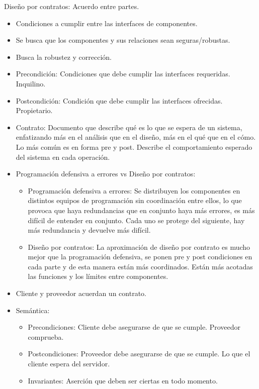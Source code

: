 \documentclass[12pt, twoside, openright]{report} %
\begin{document}
Diseño por contratos: Acuerdo entre partes.

\begin{itemize}
	\item Condiciones a cumplir entre las interfaces de componentes.
	\item Se busca que los componentes y sus relaciones sean
	      seguras/robustas.
	\item Busca la robustez y corrección.
	\item Precondición: Condiciones que debe cumplir las interfaces
	      requeridas. Inquilino.
	\item Postcondición: Condición que debe cumplir las interfaces
	      ofrecidas. Propietario.
	\item Contrato: Documento que describe qué es lo que se espera de un
	      sistema, enfatizando más en el análisis que en el diseño, más en
	      el qué que en el cómo. Lo más común es en forma pre y post.
	      Describe el comportamiento esperado del sistema en cada operación.
	\item Programación defensiva a errores vs Diseño por contratos:

	      \begin{itemize}
		      \item Programación defensiva a errores: Se distribuyen los componentes
		            en distintos equipos de programación sin coordinación entre
		            ellos, lo que provoca que haya redundancias que en conjunto haya
		            más errores, es más difícil de entender en conjunto. Cada uno se
		            protege del siguiente, hay más redundancia y devuelve más
		            difícil.
		      \item Diseño por contratos: La aproximación de diseño por contrato es
		            mucho mejor que la programación defensiva, se ponen pre y post
		            condiciones en cada parte y de esta manera están más
		            coordinados. Están más acotadas las funciones y los límites
		            entre componentes.
	      \end{itemize}
	\item Cliente y proveedor acuerdan un contrato.
	\item Semántica:

	      \begin{itemize}
		      \item Precondiciones: Cliente debe asegurarse de que se cumple.
		            Proveedor comprueba.
		      \item Postcondiciones: Proveedor debe asegurarse de que se cumple. Lo
		            que el cliente espera del servidor.
		      \item Invariantes: Aserción que deben ser ciertas en todo momento.


\end{itemize}
\end{itemize}
\end{document}
